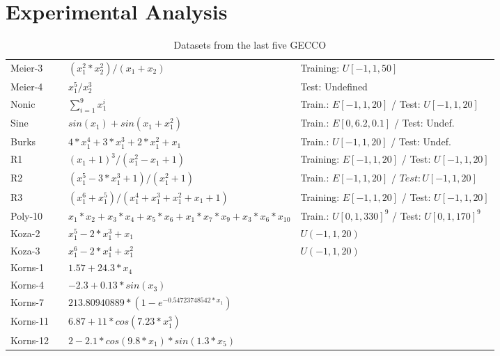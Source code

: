 \section{Experimental Analysis}

\begin{table*}[htbp]
\scriptsize
\caption{Datasets from the last five GECCO}
\begin{center}
\begin{tabular}{llll}

Meier-3  & \cite{meier2013accelerating} & $(x_1^2*x_2^2)/(x_1+x_2)$ & Training: $U[-1,1,50]$ \\ 
Meier-4  & \cite{meier2013accelerating} & $x_1^5/x_2^3$ &  Test: Undefined \\ 
Nonic & \cite{krawiec2013approximating,szubert2016reducing} & $\sum\limits_{i=1}^9 x_1^i$ & Train.: $E[-1,1,20]$ / Test: $U[-1,1,20]$ \\ 
Sine & \cite{mcphee2015impact} & $sin(x_1)+sin(x_1+x_1^2)$ & Train.: $E[0,6.2,0.1]$ / Test: Undef. \\ 
Burks & \cite{burks2015efficient,szubert2016reducing} & $4*x_1^4+3*x_1^3+2*x_1^2+x_1$ & Train.: $U[-1,1,20]$ / Test: Undef. \\ 
R1 & \cite{krawiec2013approximating,szubert2016reducing,liskowski2017discovery} & $(x_1+1)^3/(x_1^2-x_1+1)$ & Training: $E[-1,1,20]$ / Test: $U[-1,1,20]$ \\ 
R2 & \cite{krawiec2013approximating,szubert2016reducing,liskowski2017discovery} & $(x_1^5-3*x_1^3+1)/(x_1^2+1)$ & Train.: $E[-1,1,20]$ / $Test: U[-1,1,20]$ \\ 
R3 & \cite{liskowski2017discovery} & $(x_1^6+x_1^5)/(x_1^4+x_1^3+x_1^2+x_1+1)$ & Training: $E[-1,1,20]$ / Test: $U[-1,1,20]$  \\ 

Poly-10 & \cite{medernach2016new} & $x_1*x_2+x_3*x_4+x_5*x_6+x_1*x_7*x_9+x_3*x_6*x_10$ & Train.: $U[0,1,330]^{9}$ / Test: $U[0,1,170]^{9}$ \\ 
Koza-2 & \cite{meier2013accelerating} & $x_1^5-2*x_1^3+x_1$ & $U(-1, 1, 20)$ \\ 
Koza-3 & \cite{meier2013accelerating, harada2014asynchronously} & $x_1^6-2*x_1^4+x_1^2$ & $U(-1, 1, 20)$ \\ 
Korns-1 & \cite{worm2013prioritized} & $1.57+24.3*x_4$ &  \\  
Korns-4 & \cite{worm2013prioritized} & $-2.3+0.13*sin(x_3)$ &  \\ 
Korns-7 & \cite{worm2013prioritized} & $213.80940889*(1-e^{-0.54723748542*x_1})$ &  \\ 
Korns-11 & \cite{worm2013prioritized} & $6.87+11*cos(7.23*x_1^3)$ &  \\ 
Korns-12 & \cite{worm2013prioritized} & $2-2.1*cos(9.8*x_1)*sin(1.3*x_5)$ &  \\ 


\end{tabular}
\end{center}
\end{table*}
